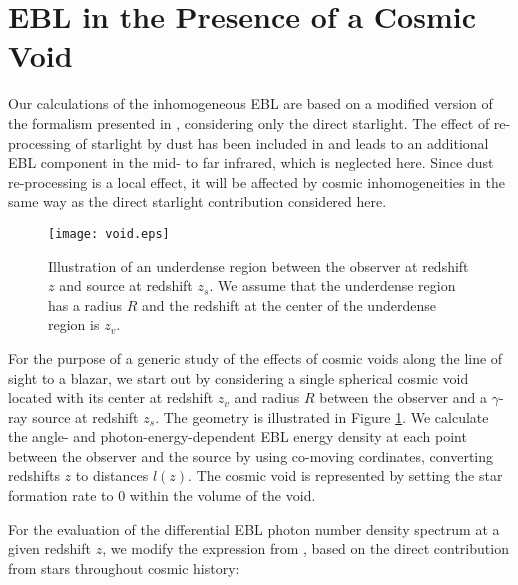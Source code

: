 \documentclass{aastex6}
\begin{document}
\section{EBL in the Presence of a Cosmic Void}
\label{Model}

Our calculations of the inhomogeneous EBL are based on a modified version of the formalism presented in
\cite{Razzaque09}, considering only the direct starlight. The effect of re-processing of starlight by
dust has been included in \cite{Finke10} and leads to an additional EBL component in the mid- to far
infrared, which is neglected here. Since dust re-processing is a local effect, it will be affected by
cosmic inhomogeneities in the same way as the direct starlight contribution considered here.

\begin{figure}[ht]
\begin{center}
\texttt{[image: void.eps]} 
    \caption{ Illustration of an underdense region between the observer at redshift 
    $z$  and source at redshift $z_{s}$. We assume that the underdense region has a radius $R$ and 
    the redshift at the center of the underdense region is $z_{v}$.
    \label{fig:geometry}}
\end{center}
\end{figure}


For the purpose of a generic study of the effects of cosmic voids along the line of sight to a blazar,
we start out by considering a single spherical cosmic void
located with its center at redshift $z_v$ 
and radius $R$ between the observer and a $\gamma$-ray source at redshift $z_{s}$. The geometry is 
illustrated in Figure \ref{fig:geometry}.
We calculate the angle- and photon-energy-dependent EBL energy density at each point between the observer 
and the source by using co-moving cordinates, converting redshifts $z$ to distances $l (z)$. 
The cosmic void is represented by setting the star formation rate to 0 within the volume of the void.  

For the evaluation of the differential EBL photon number density spectrum at a given redshift $z$, we modify
the expression from \cite{Razzaque09}, based on the direct contribution from stars throughout cosmic history: 
\end{document}
